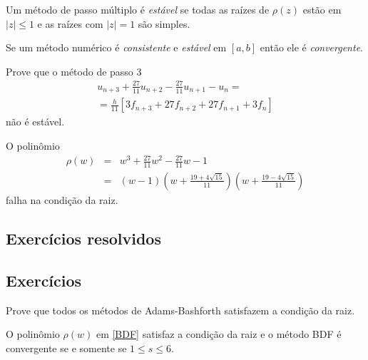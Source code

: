 \begin{teo}
Um método de passo múltiplo é \emph{estável} se todas as raízes de  $\rho (z)$ estão em $|z|\leq 1$ e as raízes com $|z|=1$ são simples.
\end{teo}


\begin{teo}
Se um método numérico é \emph{consistente} e \emph{estável} em $[a,b]$ então ele é \emph{convergente}.
\end{teo}



\begin{ex}
Prove que o método de passo $3$
\begin{eqnarray}\label{multis3}
  u_{n+3} +\frac{27}{11}u_{n+2} -\frac{27}{11}u_{n+1} -u_{n}  =\\
   =\frac{h}{11} [3 f_{n+3}+27f_{n+2}+27f_{n+1} +3f_{n}]
\end{eqnarray}
não é estável.
\end{ex}
\begin{sol}
O polinômio
\begin{eqnarray}
   \rho (w) &=&w^3+\frac{27}{11}w^2 -\frac{27}{11}w -1 \\
        &=&(w-1)\left(w+\frac{19+4\sqrt{15}}{11}\right)
                \left(w+\frac{19-4\sqrt{15}}{11}\right)
\end{eqnarray}
falha na condição da raiz.
\end{sol}


\subsection*{Exercícios resolvidos}

\emconstrucao

\subsection*{Exercícios}

\begin{exer}
Prove que todos os métodos de Adams-Bashforth satisfazem a condição da raiz.
\end{exer}

\begin{teo}
O polinômio $\rho (w)$ em \eqref{BDF} satisfaz a condição da raiz e o método BDF é convergente se e somente se $1\leq s\leq 6$.
\end{teo}

